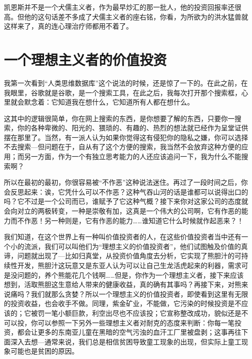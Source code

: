 凯恩斯并不是一个犬儒主义者，作为最早炒汇的那一批人，他的投资回报率还很高。但他的这句话差不多成了犬儒主义者的座右铭，你看，为所欲为的洪水猛兽就这样来了，真的连心理治疗师都用不着了。

\hypertarget{ux4e00ux4e2aux7406ux60f3ux4e3bux4e49ux8005ux7684ux4ef7ux503cux6295ux8d44}{%
\section{一个理想主义者的价值投资}\label{ux4e00ux4e2aux7406ux60f3ux4e3bux4e49ux8005ux7684ux4ef7ux503cux6295ux8d44}}

我第一次看到``人类思维数据库''这个说法的时候，还是惊了一下的。在此之前，在我眼里，谷歌就是谷歌，是一个搜索工具，在此之后，我每次打开那个搜索框，心里就会默念着：它知道我在想什么，它知道所有人都在想什么。

这其中的逻辑很简单，你在网上搜索的东西，是你想要了解的东西，只要你一搜索，你的各种卑微的、阳光的、猥琐的、有趣的、热烈的想法就已经作为呈堂证供摆在那里了。当然，有一派人认为如果你觉得这有侵犯你的隐私之嫌，你可以选择不去搜索---但问题在于，自从有了这个方便的搜索，我当然不会放弃这种方便的应用；而另一方面，作为一个有独立思考能力的人还应该追问一下，我为什么不能搜索啊？

所以在最初的最初，你很容易被``不作恶''这种说法迷住。再过了一段时间之后，你会反思起来：诶，它凭什么可以不作恶？这种气吞山河的话是谁都可以说得出口的吗？它不过是一个公司而已，谁赋予了它这种气概？接下来你对这家公司的态度就会向对立的两极转变，一种是崇敬有加，这真是一个伟大的公司啊，它有作恶的能力而不作恶！另一种则是，它有作恶的能力\ldots\ldots 谁知道它什么时候就作起恶来？！

我们知道，在这个世界上有一种叫价值投资者的人，在这些价值投资者当中还有一个小的流派，我们可以叫他们为``理想主义的价值投资者''，他们试图触及价值的真谛，问题就出现了---比如归真堂，从投资价值角度去分析，它实现了熊胆汁的可持续性开发，熊胆汁这玩意又是东亚人认为可以让自己生龙活虎起来的利器，需求可是没问题的，养个熊能花几个钱啊\ldots\ldots 但是，你作为一个理想主义者，接下来应该想到，活取熊胆这生意给人带来的健康收益，真的确有其事吗？再接下来，对熊来说痛吗？我们就那么贪婪？所以一个理想主义的价值投资者，即使看到这里有无限的投资收益，也会收手不做。同理，紫金矿业，不能做，它污染的时候投资是不应该的；它被罚一笔小额巨款，利空出尽也不应该投；它宣称整改成功，貌似还是不可以投，你可以参照一下另外一些理想主义者对耐克的态度来判断：你每一笔投资，都会让更多的东南亚儿童在黑暗的空气污浊的血汗工厂里被盘剥；这事再往下面深入去想---通常来说，我们总是相信贫困导致童工现象的出现，但实际上童工现象可能也是贫困的原因。

